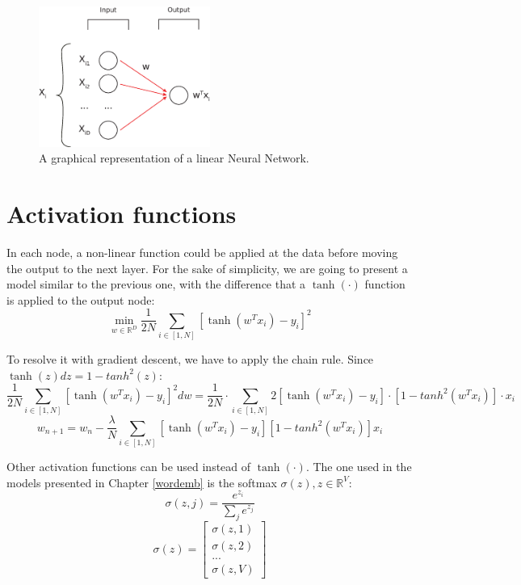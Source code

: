 \begin{figure}[h]
    \centering
    \includegraphics[width=0.5\textwidth]{images/nn-linear.eps}
    \caption{A graphical representation of a linear Neural Network.}
    \label{fig:nn-linear}
\end{figure}

\section{Activation functions}
In each node, a non-linear function could be applied at the data before moving the output to the next layer.
For the sake of simplicity, we are going to present a model similar to the previous one,
with the difference that a $\tanh(\cdot)$ function is applied to the output node:
\[ \displaystyle \min_{w \in \mathbb{R}^D} \frac{1}{2N} \sum_{i \in [1, N]} [\tanh(w^T x_i) - y_i]^2 \]

To resolve it with gradient descent, we have to apply the chain rule.
Since $\tanh(z) dz = 1 - tanh^2(z)$:
\[ \frac{1}{2N} \sum_{i \in [1, N]} [\tanh(w^T x_i) - y_i]^2 dw =
    \frac{1}{2N} \cdot \sum_{i \in [1, N]} 2[\tanh(w^T x_i) - y_i] \cdot [1 - tanh^2(w^T x_i)] \cdot x_i \]
\[ w_{n+1} = w_n -
    \frac{\lambda}{N} \sum_{i \in [1, N]} [\tanh(w^T x_i) - y_i] [1 - tanh^2(w^T x_i)] x_i \]

Other activation functions can be used instead of $\tanh(\cdot)$.
The one used in the models presented in Chapter \ref{wordemb} is the softmax
$\sigma(z), z \in \mathbb{R}^V$:
\[\sigma(z, j) =  \frac{e^{z_i}}{\sum_j e^{z_j}}\]
\[ \sigma(z) =
    \begin{bmatrix}
        \sigma(z, 1) \\ \sigma(z, 2) \\ ... \\ \sigma(z, V)
    \end{bmatrix}
\]

